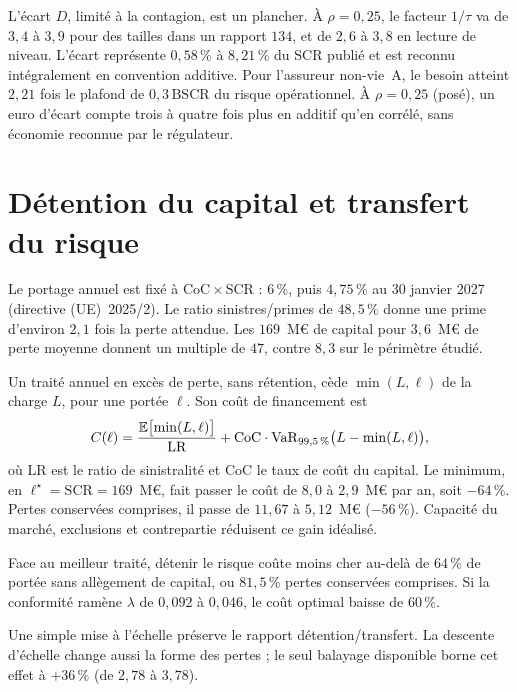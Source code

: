 \vspace{2pt}
\noindent L'écart $D$, limité à la contagion, est un plancher. À $\rho = 0{,}25$, le facteur $1/\tau$
va de $3{,}4$ à $3{,}9$ pour des tailles dans un rapport $134$, et de $2{,}6$ à $3{,}8$ en lecture de niveau.
L'écart représente $0{,}58\,\%$ à $8{,}21\,\%$ du SCR publié et est reconnu intégralement en convention additive.
Pour l'assureur non-vie~A, le besoin atteint $2{,}21$ fois le plafond de $0{,}3\,\mathrm{BSCR}$ du risque opérationnel.
À $\rho=0{,}25$ (posé), un euro d'écart compte trois à quatre fois plus en additif qu'en corrélé, sans économie reconnue par le régulateur.

\section{Détention du capital et transfert du risque}
\label{sec:detenir-transferer}

Le portage annuel est fixé à $\mathrm{CoC}\times\mathrm{SCR}$ : $6\,\%$, puis $4{,}75\,\%$ au 30 janvier 2027 (directive (UE)~2025/2).
Le ratio sinistres/primes de $48{,}5\,\%$ donne une prime d'environ $2{,}1$ fois la perte attendue.
Les $169$~M\euro{} de capital pour $3{,}6$~M\euro{} de perte moyenne donnent un multiple de $47$, contre $8{,}3$ sur le périmètre étudié.

Un traité annuel en excès de perte, sans rétention, cède $\min(L,\ell)$ de la charge $L$, pour une portée $\ell$.
Son coût de financement est
\begin{equation}\label{eq:cout-transfert}
C(\ell)=\frac{\mathbb{E}\bigl[\min(L,\ell)\bigr]}{\mathrm{LR}}
+\mathrm{CoC}\cdot\mathrm{VaR}_{99{,}5\,\%}\bigl(L-\min(L,\ell)\bigr),
\end{equation}
où $\mathrm{LR}$ est le ratio de sinistralité et $\mathrm{CoC}$ le taux de coût du capital. Le minimum,
en $\ell^\star=\mathrm{SCR}=169$~M\euro{}, fait passer le coût de $8{,}0$ à $2{,}9$~M\euro{} par
an, soit $-64\,\%$. Pertes conservées comprises, il passe de $11{,}67$ à $5{,}12$~M\euro{} ($-56\,\%$).
Capacité du marché, exclusions et contrepartie réduisent ce gain idéalisé.

Face au meilleur traité, détenir le risque coûte moins cher au-delà de $64\,\%$ de portée sans allègement de capital,
ou $81{,}5\,\%$ pertes conservées comprises.
Si la conformité ramène $\lambda$ de $0{,}092$ à $0{,}046$, le coût optimal baisse de $60\,\%$.

Une simple mise à l'échelle préserve le rapport détention/transfert. La descente d'échelle change aussi la forme des pertes ;
le seul balayage disponible borne cet effet à $+36\,\%$ (de $2{,}78$ à $3{,}78$).
